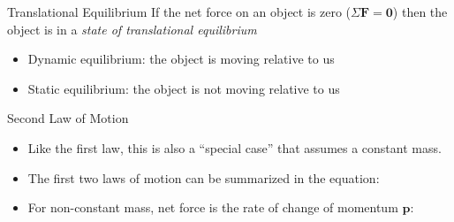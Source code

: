\documentclass[12pt,compress,aspectratio=169]{beamer}
\newcommand{\eq}[2]{\vspace{#1}{\Large\begin{displaymath}#2\end{displaymath}}}
\begin{document}
\begin{frame}{Translational Equilibrium}
  If the net force on an object is zero ($\Sigma\bm{F}=\bm{0}$) then the
  object is in a \emph{state of translational equilibrium}
  \begin{itemize}
  \item Dynamic equilibrium: the object is moving relative to us
  \item Static equilibrium: the object is not moving relative to us
  \end{itemize}
\end{frame}



\begin{frame}{Second Law of Motion}
  \begin{center}
  \end{center}
  \begin{itemize}
  \item\textcolor{red!80!black}{Like the first law, this is also a
    ``special case'' that assumes a constant mass.}
  \item The first two laws of motion can be summarized in the equation:

    \eq{-.2in}{
      \boxed{\bm{F}_\text{net}=\Sigma\bm{F}=m\bm{a}}
    }
  \item For non-constant mass, net force is the rate of change of momentum
    $\bm{p}$:

    \eq{-.2in}{
      \boxed{
        \bm{F}_\text{net}=\diff{\bm{p}}t
      }
    }
  \end{itemize}
\end{frame}
\end{document}
